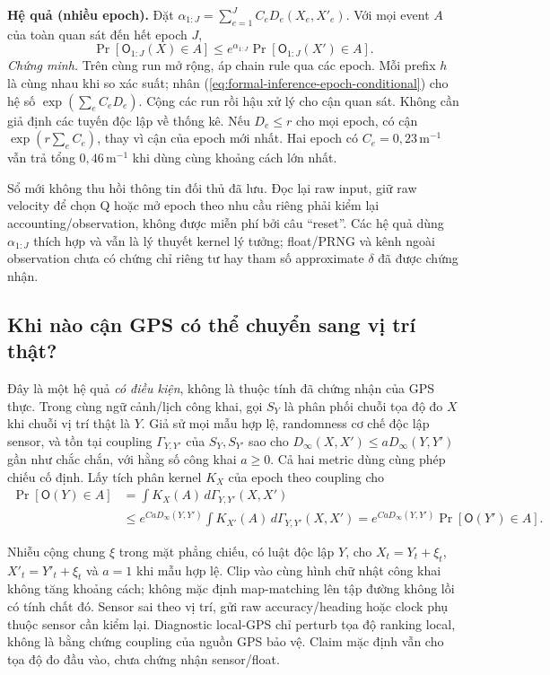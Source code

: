 \noindent\textbf{Hệ quả (nhiều epoch).} Đặt
$\alpha_{1:J}=\sum_{e=1}^J C_eD_e(X_e,X'_e)$. Với mọi event $A$ của
toàn quan sát đến hết epoch $J$,
\begin{equation}
 \Pr[\mathsf O_{1:J}(X)\in A]
 \leq e^{\alpha_{1:J}}\Pr[\mathsf O_{1:J}(X')\in A].
 \label{eq:formal-inference-epoch-composition}
\end{equation}
\emph{Chứng minh.} Trên cùng run mở rộng, áp chain rule qua các epoch.
Mỗi prefix $h$ là cùng nhau khi so xác suất; nhân
(\ref{eq:formal-inference-epoch-conditional}) cho hệ số
$\exp(\sum_e C_eD_e)$. Cộng các run rồi hậu xử lý cho cận quan sát.
Không cần giả định các tuyến độc lập về thống kê. Nếu
$D_e\leq r$ cho mọi epoch, có cận $\exp(r\sum_e C_e)$, thay vì cận của
epoch mới nhất. Hai epoch có $C_e=0{,}23\,\mathrm m^{-1}$ vẫn trả tổng
$0{,}46\,\mathrm m^{-1}$ khi dùng cùng khoảng cách lớn nhất.

Sổ mới không thu hồi thông tin đối thủ đã lưu. Đọc lại raw input, giữ raw
velocity để chọn Q hoặc mở epoch theo nhu cầu riêng phải kiểm lại
accounting/observation, không được miễn phí bởi câu ``reset''.
Các hệ quả dùng $\alpha_{1:J}$ thích hợp và vẫn là lý thuyết kernel lý
tưởng; float/PRNG và kênh ngoài observation chưa có chứng chỉ riêng tư
hay tham số approximate $\delta$ đã được chứng nhận.

\subsection{Khi nào cận GPS có thể chuyển sang vị trí thật?}
\label{sec:formal-inference-sensor}

Đây là một hệ quả \emph{có điều kiện}, không là thuộc tính đã chứng nhận
của GPS thực. Trong cùng ngữ cảnh/lịch công khai, gọi $S_Y$ là phân phối
chuỗi tọa độ đo $X$ khi chuỗi vị trí thật là $Y$. Giả sử mọi mẫu hợp lệ,
randomness cơ chế độc lập sensor, và tồn tại coupling $\Gamma_{Y,Y'}$
của $S_Y,S_{Y'}$ sao cho
$D_\infty(X,X')\leq aD_\infty(Y,Y')$ gần như chắc chắn, với hằng số
công khai $a\geq0$. Cả hai metric dùng cùng phép chiếu cố định. Lấy tích
phân kernel $K_X$ của epoch theo coupling cho
\begin{equation}
 \begin{split}
 \Pr[\mathsf O(Y)\in A]
 &=\int K_X(A)\,d\Gamma_{Y,Y'}(X,X')\\
 &\leq e^{CaD_\infty(Y,Y')}
       \int K_{X'}(A)\,d\Gamma_{Y,Y'}(X,X')
 =e^{CaD_\infty(Y,Y')}\Pr[\mathsf O(Y')\in A].
 \end{split}
 \label{eq:formal-inference-sensor-coupling}
\end{equation}

Nhiễu cộng chung $\xi$ trong mặt phẳng chiếu, có luật độc lập $Y$, cho
$X_t=Y_t+\xi_t$, $X'_t=Y'_t+\xi_t$ và $a=1$ khi mẫu hợp lệ. Clip vào
cùng hình chữ nhật công khai không tăng khoảng cách; không mặc định
map-matching lên tập đường không lồi có tính chất đó. Sensor sai theo vị
trí, gửi raw accuracy/heading hoặc clock phụ thuộc sensor cần kiểm lại.
Diagnostic local-GPS chỉ perturb tọa độ ranking local, không là bằng
chứng coupling của nguồn GPS bảo vệ. Claim mặc định vẫn cho tọa độ đo
đầu vào, chưa chứng nhận sensor/float.
